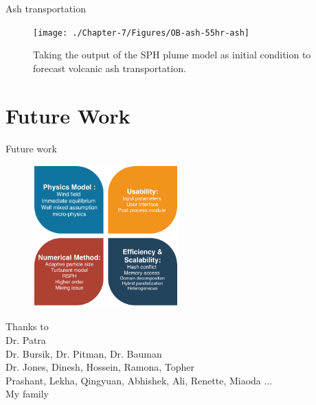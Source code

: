 \documentclass{beamer}
\begin{document}
\begin{frame}{Ash transportation}
\begin{figure}[!htb]
\begin{minipage}{.295\textwidth}
    \end{minipage}%
    \begin{minipage}{.295\textwidth}
        \centering
        \texttt{[image: ./Chapter-7/Figures/OB-ash-55hr-ash]}
    \end{minipage}%
    \caption{Taking the output of the SPH plume model as initial condition to forecast volcanic ash transportation.}
    \label{fig:Plume-SPH-Pinatubo-SO2-cloud}
\end{figure}
\end{frame}

\section{Future Work}
\begin{frame} {Future work}
\begin{figure}
	\includegraphics[width=0.5\textwidth]{./PPT/Future-Work}
\end{figure}
\end{frame}
%
\begin{frame}{}
\center
\huge{
Thanks to \\}
\Large
{
Dr. Patra \\
Dr. Bursik, Dr. Pitman, Dr. Bauman \\
Dr. Jones, Dinesh, Hossein, Ramona, Topher \\
Prashant, Lekha, Qingyuan, Abhishek, Ali, Renette, Miaoda ...\\
My family \\
}
\end{frame}
\end{document}
